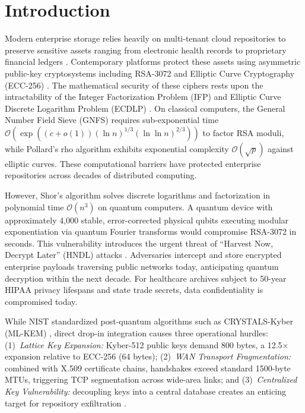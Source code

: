 \documentclass{llncs}
\begin{document}
\section{Introduction}
Modern enterprise storage relies heavily on multi-tenant cloud repositories to preserve sensitive assets ranging from electronic health records to proprietary financial ledgers \cite{mell2011nist}. Contemporary platforms protect these assets using asymmetric public-key cryptosystems including RSA-3072 and Elliptic Curve Cryptography (ECC-256) \cite{boneh2020graduate}. The mathematical security of these ciphers rests upon the intractability of the Integer Factorization Problem (IFP) and Elliptic Curve Discrete Logarithm Problem (ECDLP) \cite{katz2020introduction}. On classical computers, the General Number Field Sieve (GNFS) requires sub-exponential time $\mathcal{O}(\exp((c + o(1))(\ln n)^{1/3}(\ln \ln n)^{2/3}))$ to factor RSA moduli, while Pollard's rho algorithm exhibits exponential complexity $\mathcal{O}(\sqrt{p})$ against elliptic curves. These computational barriers have protected enterprise repositories across decades of distributed computing.

However, Shor's algorithm \cite{shor1994algorithms} solves discrete logarithms and factorization in polynomial time $\mathcal{O}(n^3)$ on quantum computers. A quantum device with approximately 4,000 stable, error-corrected physical qubits executing modular exponentiation via quantum Fourier transforms would compromise RSA-3072 in seconds. This vulnerability introduces the urgent threat of ``Harvest Now, Decrypt Later'' (HNDL) attacks \cite{mosca2022quantum}. Adversaries intercept and store encrypted enterprise payloads traversing public networks today, anticipating quantum decryption within the next decade. For healthcare archives subject to 50-year HIPAA privacy lifespans and state trade secrets, data confidentiality is compromised today.

While NIST standardized post-quantum algorithms such as CRYSTALS-Kyber (ML-KEM) \cite{bos2018crystals,avanzi2021crystals}, direct drop-in integration causes three operational hurdles: (1)~\emph{Lattice Key Expansion:} Kyber-512 public keys demand 800 bytes, a 12.5$\times$ expansion relative to ECC-256 (64 bytes); (2)~\emph{WAN Transport Fragmentation:} combined with X.509 certificate chains, handshakes exceed standard 1500-byte MTUs, triggering TCP segmentation across wide-area links; and (3)~\emph{Centralized Key Vulnerability:} decoupling keys into a central database creates an enticing target for repository exfiltration \cite{sahai2021use}.
\end{document}

